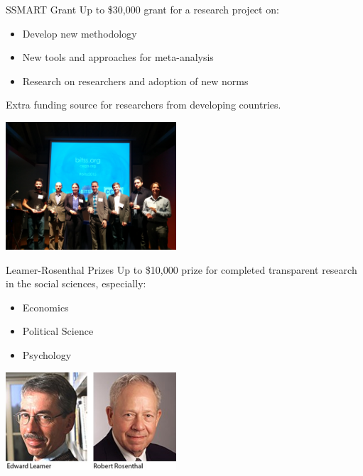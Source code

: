 \documentclass{beamer}
\begin{document}
\begin{frame}{SSMART Grant}
Up to \$30,000 grant for a research project on:
\begin{itemize}[<.->]
\item Develop new methodology
\item New tools and approaches for meta-analysis
\item Research on researchers and adoption of new norms
\end{itemize}
Extra funding source for researchers from developing countries.

\includegraphics[width=2.5in]{../Images/LRwinners.jpg}
\end{frame}

\begin{frame}{Leamer-Rosenthal Prizes}
Up to \$10,000 prize for completed transparent research in the social sciences,
especially:
\begin{itemize}[<.->]
\item Economics
\item Political Science
\item Psychology
\end{itemize}
\includegraphics[width=2.5in]{../Images/leamer1-zoomed33.jpg}
\end{frame}
\end{document}
